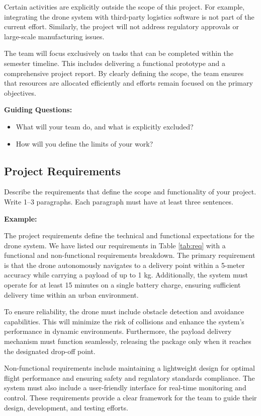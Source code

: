 Certain activities are explicitly outside the scope of this project. For example, integrating the drone system with third-party logistics software is not part of the current effort. Similarly, the project will not address regulatory approvals or large-scale manufacturing issues.

The team will focus exclusively on tasks that can be completed within the semester timeline. This includes delivering a functional prototype and a comprehensive project report. By clearly defining the scope, the team ensures that resources are allocated efficiently and efforts remain focused on the primary objectives.

\textbf{Guiding Questions:}
\begin{itemize}
    \item What will your team do, and what is explicitly excluded?
    \item How will you define the limits of your work?
\end{itemize}

\subsection{Project Requirements}

Describe the requirements that define the scope and functionality of your project. Write 1–3 paragraphs. Each paragraph must have at least three sentences.

\textbf{Example:}

The project requirements define the technical and functional expectations for the drone system. We have listed our requirements in Table \ref{tab:req} with a functional and non-functional requirements breakdown. The primary requirement is that the drone autonomously navigates to a delivery point within a 5-meter accuracy while carrying a payload of up to 1 kg. Additionally, the system must operate for at least 15 minutes on a single battery charge, ensuring sufficient delivery time within an urban environment.

To ensure reliability, the drone must include obstacle detection and avoidance capabilities. This will minimize the risk of collisions and enhance the system's performance in dynamic environments. Furthermore, the payload delivery mechanism must function seamlessly, releasing the package only when it reaches the designated drop-off point.

Non-functional requirements include maintaining a lightweight design for optimal flight performance and ensuring safety and regulatory standards compliance. The system must also include a user-friendly interface for real-time monitoring and control. These requirements provide a clear framework for the team to guide their design, development, and testing efforts.

